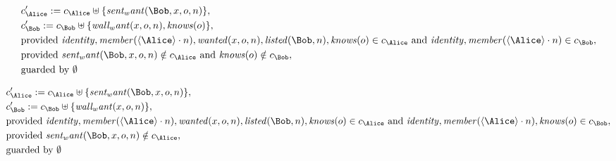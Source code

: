 \begin{align*}
&
c'_
{
\Alice
}
 := 
c_
{
\Alice
}
 \uplus 
\{
\mathit{
sent_want
}
(
\Bob
,
x
,
o
,
n
)
\}
,\\
&
c'_
{
\Bob
}
 := 
c_
{
\Bob
}
 \uplus 
\{
\mathit{
wall_want
}
(
x
,
o
,
n
)
,
\mathit{
knows
}
(
o
)
\}
,\\
&
\text{provided } 
\mathit{
identity
}
,
\mathit{
member
}
(
\langle
\Alice
\rangle
\cdot
n
)
,
\mathit{
wanted
}
(
x
,
o
,
n
)
,
\mathit{
listed
}
(
\Bob
,
n
)
,
\mathit{
knows
}
(
o
)
 \in c_
{
\Alice
}
 \text{ and } 
\mathit{
identity
}
,
\mathit{
member
}
(
\langle
\Alice
\rangle
\cdot
n
)
 \in c_
{
\Bob
}
,\\
&
\text{provided } 
\mathit{
sent_want
}
(
\Bob
,
x
,
o
,
n
)
 \notin c_
{
\Alice
}
 \text{ and } 
\mathit{
knows
}
(
o
)
 \notin c_
{
\Bob
}
,\\
&
\text{guarded by } \emptyset
\end{align*}

\begin{align*}
&
c'_
{
\Alice
}
 := 
c_
{
\Alice
}
 \uplus 
\{
\mathit{
sent_want
}
(
\Bob
,
x
,
o
,
n
)
\}
,\\
&
c'_
{
\Bob
}
 := 
c_
{
\Bob
}
 \uplus 
\{
\mathit{
wall_want
}
(
x
,
o
,
n
)
\}
,\\
&
\text{provided } 
\mathit{
identity
}
,
\mathit{
member
}
(
\langle
\Alice
\rangle
\cdot
n
)
,
\mathit{
wanted
}
(
x
,
o
,
n
)
,
\mathit{
listed
}
(
\Bob
,
n
)
,
\mathit{
knows
}
(
o
)
 \in c_
{
\Alice
}
 \text{ and } 
\mathit{
identity
}
,
\mathit{
member
}
(
\langle
\Alice
\rangle
\cdot
n
)
,
\mathit{
knows
}
(
o
)
 \in c_
{
\Bob
}
,\\
&
\text{provided } 
\mathit{
sent_want
}
(
\Bob
,
x
,
o
,
n
)
 \notin c_
{
\Alice
}
,\\
&
\text{guarded by } \emptyset
\end{align*}

